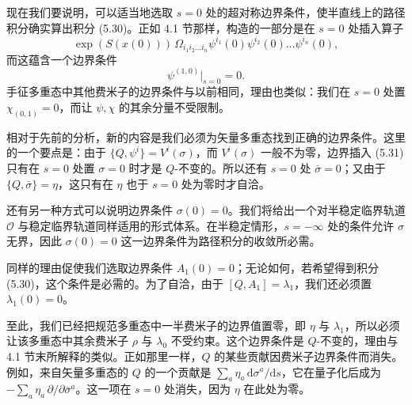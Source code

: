 \documentclass[11pt,a4paper,UTF8]{ctexart}
\theoremstyle{plain}
\theoremstyle{definition}
\begin{document}
现在我们要说明，可以适当地选取 $s=0$ 处的超对称边界条件，使半直线上的路径积分确实算出积分 (5.30)。正如 4.1 节那样，构造的一部分是在 $s=0$ 处插入算子
\begin{equation}
    \exp(S(x(0)))\,\Omega_{i_1i_2\ldots i_n}\psi^{i_1}(0)\psi^{i_2}(0)\ldots\psi^{i_n}(0),
    \tag{5.31}
\end{equation}
而这蕴含一个边界条件
\begin{equation}
    \psi^{(1,0)}\big|_{s=0}=0.
    \tag{5.32}
\end{equation}
手征多重态中其他费米子的边界条件与以前相同，理由也类似：我们在 $s=0$ 处置 $\chi_{(0,1)}=0$，而让 $\psi,\chi$ 的其余分量不受限制。

相对于先前的分析，新的内容是我们必须为矢量多重态找到正确的边界条件。这里的一个要点是：由于 $\{Q,\psi^i\}=V^i(\sigma)$，而 $V^i(\sigma)$ 一般不为零，边界插入 (5.31) 只有在 $s=0$ 处置 $\sigma=0$ 时才是 $Q$-不变的。所以还有 $s=0$ 处 $\bar\sigma=0$；又由于 $\{Q,\bar\sigma\}=\eta$，这只有在 $\eta$ 也于 $s=0$ 处为零时才自洽。


还有另一种方式可以说明边界条件 $\sigma(0)=0$。我们将给出一个对半稳定临界轨道 $\mathcal O$ 与稳定临界轨道同样适用的形式体系。在半稳定情形，$s=-\infty$ 处的条件允许 $\sigma$ 无界，因此 $\sigma(0)=0$ 这一边界条件为路径积分的收敛所必需。

同样的理由促使我们选取边界条件 $A_1(0)=0$；无论如何，若希望得到积分 (5.30)，这个条件是必需的。为了自洽，由于 $[Q,A_1]=\lambda_1$，我们还必须置 $\lambda_1(0)=0$。

至此，我们已经把规范多重态中一半费米子的边界值置零，即 $\eta$ 与 $\lambda_1$，所以必须让该多重态中其余费米子 $\rho$ 与 $\lambda_0$ 不受约束。这个边界条件是 $Q$-不变的，理由与 4.1 节末所解释的类似。正如那里一样，$Q$ 的某些贡献因费米子边界条件而消失。例如，来自矢量多重态的 $Q$ 的一个贡献是 $\sum_a\eta_a\,\mathrm d\sigma^a/\mathrm ds$，它在量子化后成为 $-\sum_a\eta_a\,\partial/\partial\bar\sigma^a$。这一项在 $s=0$ 处消失，因为 $\eta$ 在此处为零。

\end{document}
